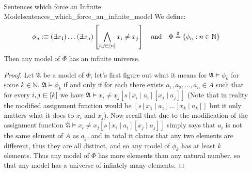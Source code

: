 \begin{proposition}{Sentences which force an Infinite
    Model}{sentences_which_force_an_infinite_model}
    We define: 
    \[
     \phi _{ n }  :\equiv \left( \exists x _{ 1 }   \right) \ldots \left(
     \exists x _{ n }   \right) \left[ \bigwedge _{ i, j \din \left[ n \right] } x _{ i
     } \neq x _{ j } \right]  \quad \text{and} \quad \Phi \stackrel{\mathtt{D}}{=}
     \left\{ \phi  _{ n } : n \in  \mathbb{N} \right\} 
    \]
    Then any model of \( \Phi  \) has an infinite universe.
\end{proposition}
\begin{proof}
    \item Let \( \mathfrak{ A }   \) be a model of \( \Phi  \), let's first
    figure out what it means for \( \mathfrak{ A } \models \phi _{ k }   \) for
    some \( k \in  \mathbb{N}  \). 
    \( \mathfrak{ A } \models \phi _{ k }   \) if and only if for each there
    exists \( a_{1} , a_{2} , \dotsc , a_{n} \in  A \) such that for every \( i,
    j \din \left[ k \right] \) we have \( \mathfrak{ A } \models x _{ i } \neq x
    _{ j } \left[ s \left[ x _{ i }  \mid a _{ i }  \right] \left[ x _{ j }
   \mid a _{ j }  \right]   \right] \) (Note that in reality the modified
   assignment function would be \( \left[ s \left[ x _{ 1 } \mid a _{ 1 }
   \right] \ldots \left[ x _{ k }  \mid a _{ k }  \right]   \right]  \) but it
   only matters what it does to \( x _{ i }  \) and \( x _{ j }  \)). Now recall
   that due to the modification of the assignment function \( \mathfrak{ A }
   \models x _{ i } \neq x _{ j } \left[ s \left[ x _{ i }  \mid a _{ i }
   \right] \left[ x _{ j } \mid a _{ j }  \right]  \right]   \) simply says that
   \( a _{ i }  \) is not the same element of \( A \) as \( a _{ j }  \), and in
   total it claims that any two elements are different, thus they are all
   distinct, and so any model of \( \phi _{ k }  \) has at least \( k \)
   elements. Thus any model of \( \Phi  \) has more elements than any natural
   number, so that any model has a universe of infintely many elements.
\end{proof}




